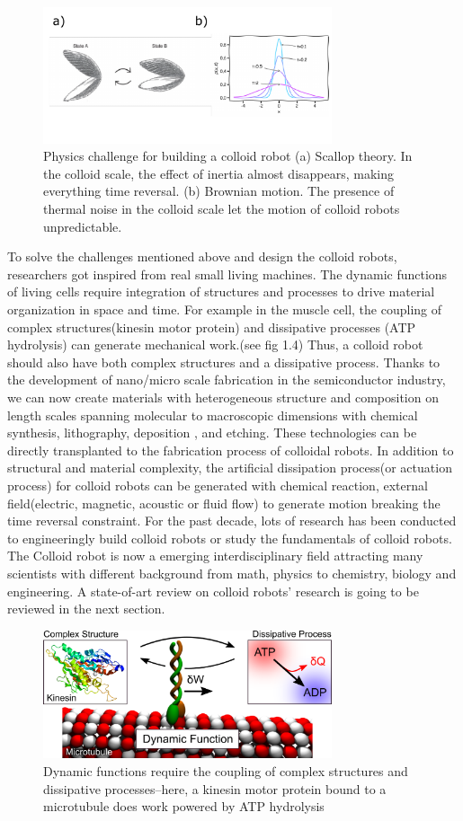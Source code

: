 \begin{figure}
\centering
\includegraphics[width=8.5cm]{figures/1_3.pdf}
\caption{Physics challenge for building a colloid robot (a) Scallop theory. In the colloid scale, the effect of inertia almost disappears, making everything time reversal. (b) Brownian motion. The presence of thermal noise in the colloid scale let the motion of colloid robots unpredictable.}
\label{fig:1.3}
\end{figure}
To solve the  challenges mentioned above and design the colloid robots, researchers got inspired from real small living  machines. The dynamic functions of living cells require integration of structures and processes to drive material organization in space and time. For example in the muscle cell,  the coupling of complex structures(kinesin motor protein) and dissipative processes (ATP hydrolysis) can generate mechanical work.(see fig 1.4) Thus, a colloid robot should also have both complex structures and a dissipative process. Thanks to the development of nano/micro scale fabrication in the semiconductor industry, we can now create materials with heterogeneous structure and composition on length scales spanning molecular to macroscopic dimensions with chemical synthesis, lithography, deposition , and etching. These technologies can be directly transplanted to the fabrication process of colloidal robots. In addition to structural and material complexity, the artificial dissipation process(or actuation process) for colloid robots  can be generated  with chemical reaction, external field(electric, magnetic, acoustic or fluid flow) to generate motion breaking the time reversal constraint. For the past decade, lots of research has been conducted to engineeringly build colloid robots  or study the fundamentals of colloid robots. The Colloid robot is now a emerging interdisciplinary field attracting many scientists with different background from math, physics to chemistry, biology and engineering. A state-of-art  review on colloid robots' research is going to be reviewed in the next section.
\begin{figure}
\centering
\includegraphics[width=8.5cm]{figures/1_4.png}
\caption{Dynamic functions require the coupling of complex structures and dissipative processes–here, a kinesin motor protein bound to a microtubule  does work powered by ATP hydrolysis}
\label{fig:1.4}
\end{figure}

